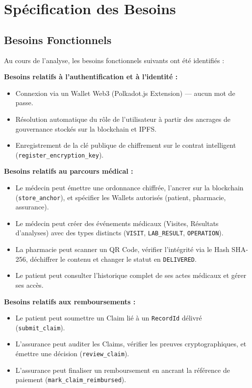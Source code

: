 \documentclass[12pt,a4paper]{report}
\begin{document}
\section{Spécification des Besoins}

\subsection{Besoins Fonctionnels}
Au cours de l'analyse, les besoins fonctionnels suivants ont été identifiés :

\textbf{Besoins relatifs à l'authentification et à l'identité :}
\begin{itemize}
    \item Connexion via un Wallet Web3 (Polkadot.js Extension) — aucun mot de passe.
    \item Résolution automatique du rôle de l'utilisateur à partir des ancrages de gouvernance stockés sur la blockchain et IPFS.
    \item Enregistrement de la clé publique de chiffrement sur le contrat intelligent (\texttt{register\_encryption\_key}).
\end{itemize}

\textbf{Besoins relatifs au parcours médical :}
\begin{itemize}
    \item Le médecin peut émettre une ordonnance chiffrée, l'ancrer sur la blockchain (\texttt{store\_anchor}), et spécifier les Wallets autorisés (patient, pharmacie, assurance).
    \item Le médecin peut créer des événements médicaux (Visites, Résultats d'analyses) avec des types distincts (\texttt{VISIT}, \texttt{LAB\_RESULT}, \texttt{OPERATION}).
    \item La pharmacie peut scanner un QR Code, vérifier l'intégrité via le Hash SHA-256, déchiffrer le contenu et changer le statut en \texttt{DELIVERED}.
    \item Le patient peut consulter l'historique complet de ses actes médicaux et gérer ses accès.
\end{itemize}

\textbf{Besoins relatifs aux remboursements :}
\begin{itemize}
    \item Le patient peut soumettre un Claim lié à un \texttt{RecordId} délivré (\texttt{submit\_claim}).
    \item L'assurance peut auditer les Claims, vérifier les preuves cryptographiques, et émettre une décision (\texttt{review\_claim}).
    \item L'assurance peut finaliser un remboursement en ancrant la référence de paiement (\texttt{mark\_claim\_reimbursed}).
\end{itemize}
\end{document}
